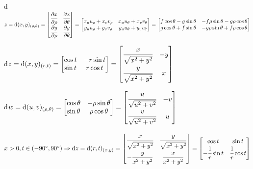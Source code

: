 \documentclass[10pt,a4paper]{article}
\begin{document}
		d$z = \mathrm{d}(x,y)_{(\rho,\theta)} = \left[ \begin{matrix} \cfrac{\partial x}{\partial \rho} & \cfrac{\partial x}{\partial \theta} \\ \cfrac{\partial y}{\partial \rho} & \cfrac{\partial y}{\partial \theta} \end{matrix} \right] = \left[ \begin{matrix} x_u u_\rho + x_v v_\rho & x_u u_\theta + x_v v_\theta \\ y_u u_\rho + y_v v_\rho & y_u u_\theta + y_v v_\theta \end{matrix} \right] = \left[ \begin{matrix} f \cos \theta -g \sin \theta & - f \rho \sin \theta -g \rho \cos \theta \\ g \cos \theta + f \sin \theta & - g  \rho \sin \theta + f  \rho \cos \theta \end{matrix} \right]$

		d$z = \mathrm{d}(x,y)_{(r,t)} = \left[ \begin{matrix} \cos t & - r \sin t \\ \sin t & r \cos t \end{matrix} \right] = \left[ \begin{matrix} \cfrac{x}{\sqrt{x^2+y^2}} & - y \\ \cfrac{y}{\sqrt{x^2+y^2}} & x \end{matrix} \right]$

		d$w = \mathrm{d}(u,v)_{(\rho,\theta)} = \left[ \begin{matrix} \cos \theta & - \rho \sin \theta \\ \sin \theta & \rho \cos \theta \end{matrix} \right] = \left[ \begin{matrix} \cfrac{u}{\sqrt{u^2+v^2}} & - v \\ \cfrac{v}{\sqrt{u^2+v^2}} & u \end{matrix} \right]$

		$x > 0, t \in (-90^\circ, 90^\circ) \Rightarrow \mathrm{d}z = \mathrm{d}(r,t)_{(x,y)} = \left[ \begin{matrix} \cfrac{x}{\sqrt{x^2 + y^2}} & \cfrac{y}{\sqrt{x^2 + y^2}} \\ -\cfrac{y}{x^2 + y^2} & \cfrac{x}{x^2 + y^2} \end{matrix} \right] = \left[ \begin{matrix} \cos t & \sin t \\ - \cfrac{1}{r} \sin t & \cfrac{1}{r} \cos t \end{matrix} \right]$
\end{document}
